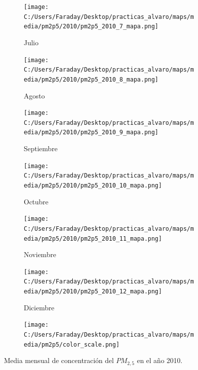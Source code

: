 \documentclass[12pt]{article}
\begin{document}
\begin{figure}[H]
\begin{subfigure}[H]{0.15\textwidth}
\texttt{[image: C:/Users/Faraday/Desktop/practicas\_alvaro/maps/media/pm2p5/2010/pm2p5\_2010\_7\_mapa.png]}
\captionsetup{labelformat=empty}
\caption{Julio}
\label{fig:map-pm2p5-2010-7}
\end{subfigure}
%
\begin{subfigure}[H]{0.15\textwidth}
\texttt{[image: C:/Users/Faraday/Desktop/practicas\_alvaro/maps/media/pm2p5/2010/pm2p5\_2010\_8\_mapa.png]}
\captionsetup{labelformat=empty}
\caption{Agosto}
\label{fig:map-pm2p5-2010-8}
\end{subfigure}
%
\begin{subfigure}[H]{0.15\textwidth}
\texttt{[image: C:/Users/Faraday/Desktop/practicas\_alvaro/maps/media/pm2p5/2010/pm2p5\_2010\_9\_mapa.png]}
\captionsetup{labelformat=empty}
\caption{Septiembre}
\label{fig:map-pm2p5-2010-9}
\end{subfigure}
%
\begin{subfigure}[H]{0.15\textwidth}
\texttt{[image: C:/Users/Faraday/Desktop/practicas\_alvaro/maps/media/pm2p5/2010/pm2p5\_2010\_10\_mapa.png]}
\captionsetup{labelformat=empty}
\caption{Octubre}
\label{fig:map-pm2p5-2010-10}
\end{subfigure}
%
\begin{subfigure}[H]{0.15\textwidth}
\texttt{[image: C:/Users/Faraday/Desktop/practicas\_alvaro/maps/media/pm2p5/2010/pm2p5\_2010\_11\_mapa.png]}
\captionsetup{labelformat=empty}
\caption{Noviembre}
\label{fig:map-pm2p5-2010-11}
\end{subfigure}
%
\begin{subfigure}[H]{0.15\textwidth}
\texttt{[image: C:/Users/Faraday/Desktop/practicas\_alvaro/maps/media/pm2p5/2010/pm2p5\_2010\_12\_mapa.png]}
\captionsetup{labelformat=empty}
\caption{Diciembre}
\label{fig:map-pm2p5-2010-12}
\end{subfigure}

\begin{subfigure}[H]{0.45\textwidth}
\texttt{[image: C:/Users/Faraday/Desktop/practicas\_alvaro/maps/media/pm2p5/color\_scale.png]}
\captionsetup{labelformat=empty}
\caption{}
\end{subfigure}

\vspace*{-7mm}
\caption{Media mensual de concentración del $PM_{2,5}$ en el año 2010.}
\label{fig:map-pm2p5-2010}
\end{figure}
\end{document}
